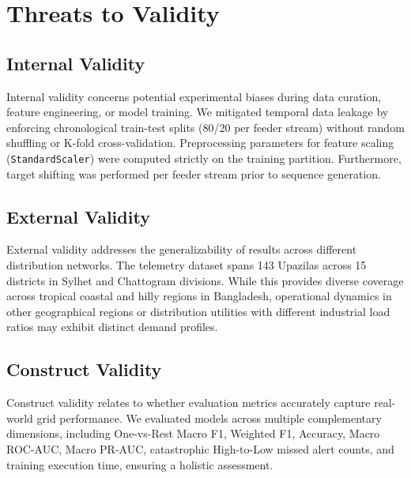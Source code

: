 \section{Threats to Validity}
\subsection{Internal Validity}
Internal validity concerns potential experimental biases during data curation, feature engineering, or model training. We mitigated temporal data leakage by enforcing chronological train-test splits (80/20 per feeder stream) without random shuffling or K-fold cross-validation. Preprocessing parameters for feature scaling (\texttt{StandardScaler}) were computed strictly on the training partition. Furthermore, target shifting was performed per feeder stream prior to sequence generation.

\subsection{External Validity}
External validity addresses the generalizability of results across different distribution networks. The telemetry dataset spans 143 Upazilas across 15 districts in Sylhet and Chattogram divisions. While this provides diverse coverage across tropical coastal and hilly regions in Bangladesh, operational dynamics in other geographical regions or distribution utilities with different industrial load ratios may exhibit distinct demand profiles.

\subsection{Construct Validity}
Construct validity relates to whether evaluation metrics accurately capture real-world grid performance. We evaluated models across multiple complementary dimensions, including One-vs-Rest Macro F1, Weighted F1, Accuracy, Macro ROC-AUC, Macro PR-AUC, catastrophic High-to-Low missed alert counts, and training execution time, ensuring a holistic assessment.

